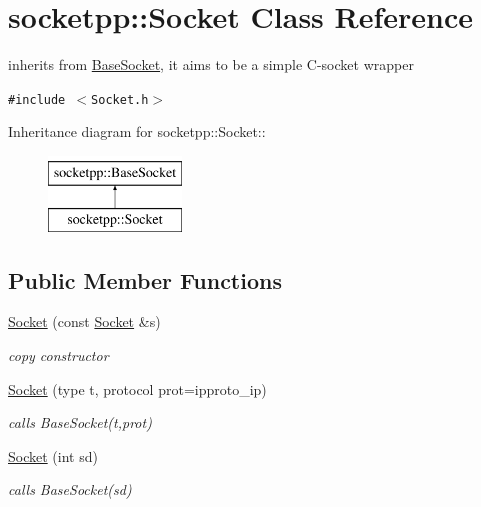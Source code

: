 \hypertarget{classsocketpp_1_1Socket}{
\section{socketpp::Socket Class Reference}
\label{classsocketpp_1_1Socket}
}
inherits from \hyperlink{classsocketpp_1_1BaseSocket}{BaseSocket}, it aims to be a simple C-socket wrapper  


{\tt \#include $<$Socket.h$>$}

Inheritance diagram for socketpp::Socket::\begin{figure}[H]
\begin{center}
\leavevmode
\includegraphics[height=2cm]{classsocketpp_1_1Socket}
\end{center}
\end{figure}
\subsection*{Public Member Functions}
\begin{CompactItemize}
\item 
\hypertarget{classsocketpp_1_1Socket_799a836f2ceab366ab11ae234970d951}{
\hyperlink{classsocketpp_1_1Socket_799a836f2ceab366ab11ae234970d951}{Socket} (const \hyperlink{classsocketpp_1_1Socket}{Socket} \&s)}
\label{classsocketpp_1_1Socket_799a836f2ceab366ab11ae234970d951}

\begin{CompactList}\small\item\em copy constructor \item\end{CompactList}\item 
\hypertarget{classsocketpp_1_1Socket_c10e4f533ed78a3d898c1fe0cea09cef}{
\hyperlink{classsocketpp_1_1Socket_c10e4f533ed78a3d898c1fe0cea09cef}{Socket} (type t, protocol prot=ipproto\_\-ip)}
\label{classsocketpp_1_1Socket_c10e4f533ed78a3d898c1fe0cea09cef}

\begin{CompactList}\small\item\em calls BaseSocket(t,prot) \item\end{CompactList}\item 
\hypertarget{classsocketpp_1_1Socket_2ec875f75becab573f7720d50ab13c99}{
\hyperlink{classsocketpp_1_1Socket_2ec875f75becab573f7720d50ab13c99}{Socket} (int sd)}
\label{classsocketpp_1_1Socket_2ec875f75becab573f7720d50ab13c99}

\begin{CompactList}\small\item\em calls BaseSocket(sd) \item\end{CompactList}\end{CompactItemize}



